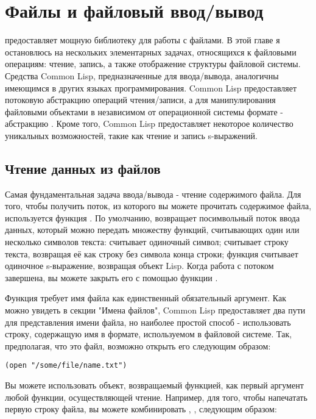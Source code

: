 \chapter{Файлы и файловый ввод/вывод}
\label{ch:14}

 предоставляет мощную библиотеку для работы с файлами. В этой главе я
остановлюсь на нескольких элементарных задачах, относящихся к файловыми операциям: чтение,
запись, а также отображение структуры файловой системы. Средства Common Lisp,
предназначенные для ввода/вывода, аналогичны имеющимся в других языках
программирования. Common Lisp предоставляет потоковую абстракцию операций чтения/записи, а
для манипулирования файловыми объектами в независимом от операционной системы формате -
абстракцию . Кроме того, Common Lisp предоставляет некоторое
количество уникальных возможностей, такие как чтение и запись s-выражений.

\section{Чтение данных из файлов}

Самая фундаментальная задача ввода/вывода - чтение содержимого файла. Для того, чтобы
получить поток, из которого вы можете прочитать содержимое файла, используется функция
. По умолчанию,  возвращает посимвольный поток ввода данных, который
можно передать множеству функций, считывающих один или несколько символов текста:
 считывает одиночный символ;  считывает строку текста,
возвращая её как строку без символа конца строки; функция  считывает одиночное
s-выражение, возвращая объект Lisp. Когда работа с потоком завершена, вы можете закрыть
его с помощью функции .

Функция  требует имя файла как единственный обязательный аргумент. Как можно
увидеть в секции "Имена файлов", Common Lisp предоставляет два пути для представления
имени файла, но наиболее простой способ - использовать строку, содержащую имя в формате,
используемом в файловой системе. Так, предполагая, что  это
файл, возможно открыть его следующим образом:

\begin{lstlisting}
(open "/some/file/name.txt")
\end{lstlisting}

Вы можете использовать объект, возвращаемый функцией, как первый аргумент любой функции,
осуществляющей чтение. Например, для того, чтобы напечатать первую строку файла, вы можете
комбинировать , ,  следующим образом:

